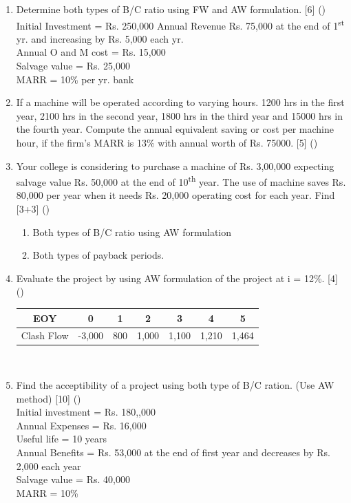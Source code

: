 \documentclass[12pt]{article}
\newcommand{\super}[1]{\textsuperscript{#1}}
\begin{document}
\begin{enumerate}[noitemsep, topsep = 0pt]
	\item Determine both types of B/C ratio using FW and AW formulation. \hfill [6] ()\\
	Initial Investment = Rs. 250,000
	Annual Revenue Rs. 75,000 at the end of 1\super{st} yr. and increasing by Rs. 5,000 each yr.\\
	Annual O and M cost = Rs. 15,000\\
	Salvage value = Rs. 25,000\\
	MARR = 10\% per yr. bank
	
	\item If a machine will be operated according to varying hours. 1200 hrs in the first year, 2100 hrs in the second year, 1800 hrs in the third year and 15000 hrs in the fourth year. Compute the annual equivalent saving or cost per machine hour, if the firm's MARR is 13\% with annual worth of Rs. 75000. \hfill [5] ()
	
	\item Your college is considering to purchase a machine of Rs. 3,00,000 expecting salvage value Rs. 50,000 at the end of 10\super{th} year. The use of machine saves Rs. 80,000 per year when it needs Rs. 20,000 operating cost for each year. Find \hfill [3+3] ()
	\begin{enumerate}[noitemsep, topsep = 0pt, label = \alph*]
		\item Both types of B/C ratio using AW formulation
		\item Both types of payback periods.
	\end{enumerate}
	
	\item Evaluate the project by using AW formulation of the project at i = 12\%. \hfill [4] ()\\
	\begin{tabular}{|c|c|c|c|c|c|c|}
		\hline
		EOY & 0 & 1 & 2 & 3 & 4 & 5\\ \hline
		Clash Flow & -3,000 & 800 & 1,000 & 1,100 & 1,210 & 1,464\\ \hline
	\end{tabular}\\[0pt]
	
	\item Find the acceptibility of a project using both type of B/C ration. (Use AW method) \hfill [10] ()\\
	Initial investment = Rs. 180,,000\\
	Annual Expenses = Rs. 16,000\\
	Useful life = 10 years\\
	Annual Benefits = Rs. 53,000 at the end of first year and decreases by Rs. 2,000 each year\\
	Salvage value = Rs. 40,000\\
	MARR = 10\%
\end{enumerate}
\end{document}

